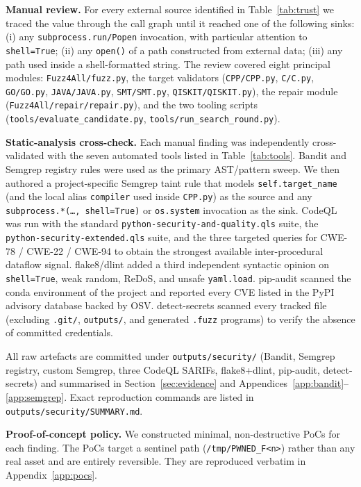 \documentclass[conference]{IEEEtran}
\begin{document}
\textbf{Manual review.} For every external source identified in
Table~\ref{tab:trust} we traced the value through the call graph until
it reached one of the following sinks: (i) any
\texttt{subprocess.run/Popen} invocation, with particular attention to
\texttt{shell=True}; (ii) any \texttt{open()} of a path constructed from
external data; (iii) any path used inside a shell-formatted string. The
review covered eight principal modules: \texttt{Fuzz4All/fuzz.py}, the
target validators (\texttt{CPP/CPP.py}, \texttt{C/C.py}, \texttt{GO/GO.py},
\texttt{JAVA/JAVA.py}, \texttt{SMT/SMT.py}, \texttt{QISKIT/QISKIT.py}),
the repair module (\texttt{Fuzz4All/repair/repair.py}), and the two
tooling scripts (\texttt{tools/evaluate\_candidate.py},
\texttt{tools/run\_search\_round.py}).

\textbf{Static-analysis cross-check.} Each manual finding was
independently cross-validated with the seven automated tools listed in
Table~\ref{tab:tools}. Bandit and Semgrep registry rules were used as
the primary AST/pattern sweep. We then authored a project-specific
Semgrep taint rule that models \texttt{self.target\_name} (and the local
alias \texttt{compiler} used inside \texttt{CPP.py}) as the source and
any \texttt{subprocess.*(\ldots, shell=True)} or \texttt{os.system}
invocation as the sink. CodeQL was run with the standard
\texttt{python-security-and-quality.qls} suite, the
\texttt{python-security-extended.qls} suite, and the three targeted
queries for CWE-78 / CWE-22 / CWE-94 to obtain the strongest available
inter-procedural dataflow signal. flake8/dlint added a third independent
syntactic opinion on \texttt{shell=True}, weak random, ReDoS, and unsafe
\texttt{yaml.load}. pip-audit scanned the conda environment of the
project and reported every CVE listed in the PyPI advisory database
backed by OSV. detect-secrets scanned every tracked file (excluding
\texttt{.git/}, \texttt{outputs/}, and generated \texttt{.fuzz} programs)
to verify the absence of committed credentials.

All raw artefacts are committed under \texttt{outputs/security/}
(Bandit, Semgrep registry, custom Semgrep, three CodeQL SARIFs,
flake8+dlint, pip-audit, detect-secrets) and summarised in
Section~\ref{sec:evidence} and
Appendices~\ref{app:bandit}--\ref{app:semgrep}. Exact reproduction
commands are listed in \texttt{outputs/security/SUMMARY.md}.

\textbf{Proof-of-concept policy.} We constructed minimal, non-destructive
PoCs for each finding. The PoCs target a sentinel path
(\texttt{/tmp/PWNED\_F<n>}) rather than any real asset and are entirely
reversible. They are reproduced verbatim in Appendix~\ref{app:pocs}.
\end{document}
